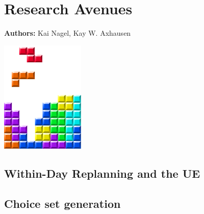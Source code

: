 \chapter{Research Avenues }
\label{ch:researchavenues}

\hfill \textbf{Authors:} Kai Nagel, Kay W. Axhausen

\begin{center} \includegraphics[width=0.3\textwidth, angle=0]{figures/MATSimBook.png} \end{center}

\section{Within-Day Replanning and the UE}

\vfill\eject
\section{Choice set generation}




\vfill\eject
